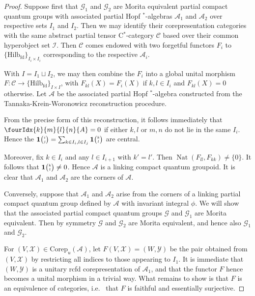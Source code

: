\documentclass[10pt]{article}
\DeclareMathOperator{\fin}{\mathrm{fd}}
\DeclareMathOperator{\Nat}{\mathrm{Nat}}
\newcommand{\Corep}{\mathrm{Corep}}
\newcommand{\CatCC}{\mathscr{C}}
\newcommand{\Hilb}{\mathrm{Hilb}}
\newcommand{\Grt}[3]{#1{\tiny {\begin{pmatrix} #2\\#3\end{pmatrix}}}}
\newcommand{\UnitC}[2]{\Grt{\mathbf{1}}{#1}{#2}}
\newcommand{\Gr}[5]{\fourIdx{#2}{#4}{#3}{#5}{#1}}%
\theoremstyle{definition}
\numberwithin{equation}{section}
\begin{document}
\begin{proof} Suppose first that $\mathscr{G}_1$ and $\mathscr{G}_2$ are Morita equivalent partial compact quantum groups with associated partial Hopf $^*$-algebras $\mathscr{A}_1$ and $\mathscr{A}_2$ over respective sets $I_1$ and $I_2$. Then we may identify their corepresentation categories with the same abstract partial tensor C$^*$-category $\CatCC$ based over their common hyperobject set $\mathscr{I}$. Then $\CatCC$ comes endowed with two forgetful functors $F_i$ to $\{\Hilb_{\fin}\}_{I_i\times I_i}$ corresponding to the respective $\mathscr{A}_i$.

With $I = I_1\sqcup I_2$, we may then combine the $F_i$ into a global unital morphism $F:\CatCC \rightarrow \{\Hilb_{\fin}\}_{I\times I}$, with $F_{kl}(X)=F_i(X)$ if $k,l\in I_i$ and $F_{kl}(X)=0$ otherwise. Let $\mathscr{A}$ be the associated partial Hopf $^*$-algebra constructed from the Tannaka-Krein-Woronowicz reconstruction procedure. 

From the precise form of this reconstruction, it follows immediately that $\Gr{A}{k}{l}{m}{n} =0$ if either $k,l$ or $m,n$ do not lie in the same $I_i$. Hence the $\UnitC{i}{j} = \sum_{k\in I_i,l\in I_j} \UnitC{k}{l}$ are central. 

Moreover, fix $k\in I_i$ and any $l\in I_{i+1}$ with $k'=l'$. Then $\Nat(F_{ll},F_{kk})\neq \{0\}$. It follows that $\UnitC{k}{l}\neq 0$. Hence $\mathscr{A}$ is a linking compact quantum groupoid. It is clear that $\mathscr{A}_1$ and $\mathscr{A}_2$ are the corners of $\mathscr{A}$. 

Conversely, suppose that $\mathscr{A}_1$ and $\mathscr{A}_2$ arise from the corners of a linking partial compact quantum group defined by $\mathscr{A}$ with invariant integral $\phi$. We will show that the associated partial compact quantum groups $\mathscr{G}$ and $\mathscr{G}_1$ are Morita equivalent. Then by symmetry $\mathscr{G}$ and $\mathscr{G}_2$ are Morita equivalent, and hence also $\mathscr{G}_1$ and $\mathscr{G}_2$.

For $(V,\mathscr{X}) \in \Corep_u(\mathscr{A})$, let $F(V,\mathscr{X}) = (W,\mathscr{Y})$ be the pair obtained from $(V,\mathscr{X})$ by restricting all indices to those appearing to $I_1$. It is immediate that $(W,\mathscr{Y})$ is a unitary rcfd corepresentation of $\mathscr{A}_1$, and that the functor $F$ hence becomes a unital morphism in a trivial way. What remains to show is that $F$ is an equivalence of categories, i.e.~ that $F$ is faithful and essentially surjective. 


\end{proof}
\end{document}
